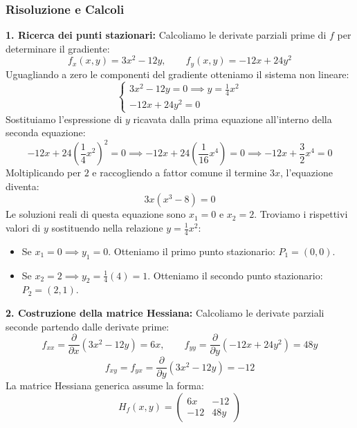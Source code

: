 \subsubsection{Risoluzione e Calcoli}
\textbf{1. Ricerca dei punti stazionari:} Calcoliamo le derivate parziali prime di $f$ per determinare il gradiente:
\[ f_x(x,y) = 3x^2 - 12y, \qquad f_y(x,y) = -12x + 24y^2 \]
Uguagliando a zero le componenti del gradiente otteniamo il sistema non lineare:
\[
\begin{cases}
3x^2 - 12y = 0 \implies y = \frac{1}{4}x^2 \\[1ex]
-12x + 24y^2 = 0
\end{cases}
\]
Sostituiamo l'espressione di $y$ ricavata dalla prima equazione all'interno della seconda equazione:
\[ -12x + 24\left(\frac{1}{4}x^2\right)^2 = 0 \implies -12x + 24\left(\frac{1}{16}x^4\right) = 0 \implies -12x + \frac{3}{2}x^4 = 0 \]
Moltiplicando per $2$ e raccogliendo a fattor comune il termine $3x$, l'equazione diventa:
\[ 3x(x^3 - 8) = 0 \]
Le soluzioni reali di questa equazione sono $x_1 = 0$ e $x_2 = 2$. Troviamo i rispettivi valori di $y$ sostituendo nella relazione $y = \frac{1}{4}x^2$:
\begin{itemize}
    \item Se $x_1 = 0 \implies y_1 = 0$. Otteniamo il primo punto stazionario: $P_1 = (0,0)$.
    \item Se $x_2 = 2 \implies y_2 = \frac{1}{4}(4) = 1$. Otteniamo il secondo punto stazionario: $P_2 = (2,1)$.
\end{itemize}

\textbf{2. Costruzione della matrice Hessiana:} Calcoliamo le derivate parziali seconde partendo dalle derivate prime:
\[ f_{xx} = \frac{\partial}{\partial x}(3x^2-12y) = 6x, \qquad f_{yy} = \frac{\partial}{\partial y}(-12x+24y^2) = 48y \]
\[ f_{xy} = f_{yx} = \frac{\partial}{\partial y}(3x^2-12y) = -12 \]
La matrice Hessiana generica assume la forma:
\[ H_f(x,y) = \begin{pmatrix} 6x & -12 \\ -12 & 48y \end{pmatrix} \]

